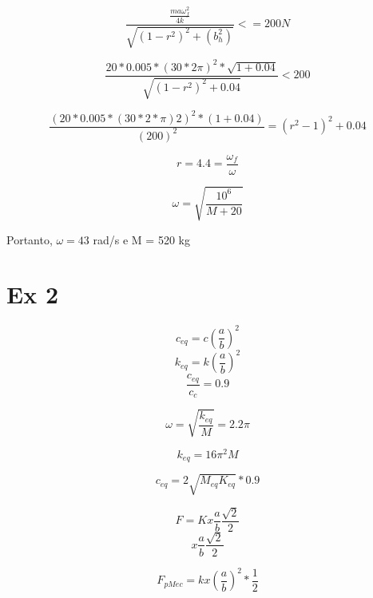 \[\frac{\frac{ma\omega_f ^{2}}{4k}}{\sqrt{(1-r^{2})^{2}+(b_{h}^{2})}} <= 200N\] 

\[\frac{20*0.005*(30*2\pi)^{2}*\sqrt{1+0.04}}{\sqrt{(1-r^{2})^{2}+0.04}}<200\]
 
\[\frac{(20*0.005*(30*2*\pi)2)^{2}*(1+0.04)}{(200)^{2}}=(r^{2}-1)^{2}+0.04\]
 
\[r = 4.4 = \frac{\omega_{f}}{\omega}\]
 

\[\omega = \sqrt{\frac{10^{6}}{M+20}}\] 

Portanto, $\omega=43$ rad/s e M = 520 kg

\section{Ex 2}

\[c_{eq} = c(\frac{a}{b})^{2}\]
\[k_{eq}= k(\frac{a}{b})^{2}\]
\[\frac{c_{eq}}{c_{c}}=0.9\] 

\[\omega=\sqrt{\frac{k_{eq}}{M}} = 2.2 \pi\]

\[k_{eq}=16 \pi^{2}M\]

\[c_{eq} = 2\sqrt{M_{eq}K_{eq}}*0.9\]




\[F = Kx\frac{a}{b}\frac{\sqrt{2}}{2}\]
\[x\frac{a}{b}\frac{\sqrt{2}}{2}\]

 


\[F_{pMec}=kx(\frac{a}{b})^{2}*\frac{1}{2}\]


